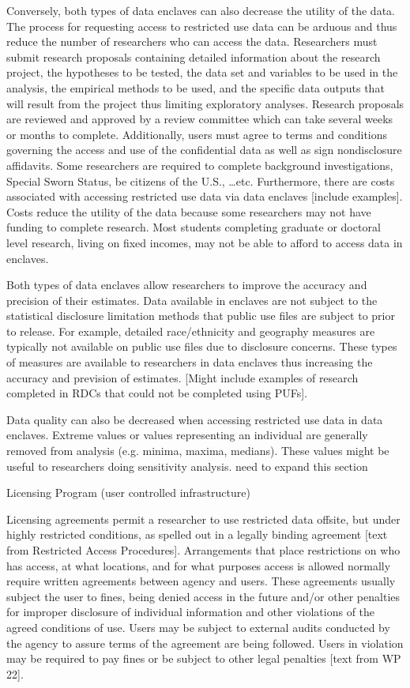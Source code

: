 \documentclass[12pt]{article}
\begin{document}
Conversely, both types of data enclaves can also decrease the utility of the data. The process for requesting access to restricted use data can be arduous and thus reduce the number of researchers who can access the data. Researchers must submit research proposals containing detailed information about the research project, the hypotheses to be tested, the data set and variables to be used in the analysis,
the empirical methods to be used, and the specific data outputs that will result from the project thus limiting exploratory analyses. Research proposals are reviewed and approved by a review committee which can take several weeks or months to complete. Additionally, users must agree to terms and conditions governing the access and use of the confidential data as well as sign nondisclosure affidavits. Some researchers are required to complete background investigations, Special Sworn Status, be citizens of the U.S.,  …etc.  Furthermore, there are costs associated with accessing restricted use data via data enclaves [include examples]. Costs reduce the utility of the data because some researchers may not have funding to complete research. Most students completing graduate or doctoral level research, living on fixed incomes, may not be able to afford to access data in enclaves. 

Both types of data enclaves allow researchers to improve the accuracy and precision of their estimates. Data available in enclaves are not subject to the statistical disclosure limitation methods that public use files are subject to prior to release. For example, detailed race/ethnicity and geography measures are typically not available on public use files due to disclosure concerns. These types of measures are available to researchers in data enclaves thus increasing the accuracy and prevision of estimates.  [Might include examples of research completed in RDCs that could not be completed using PUFs].

Data quality can also be decreased when accessing restricted use data in data enclaves. Extreme values or values representing an individual are generally removed from analysis (e.g. minima, maxima, medians). These values might be useful to researchers doing sensitivity analysis. {need to expand this section}

Licensing Program (user controlled infrastructure)

Licensing agreements permit a researcher to use restricted data offsite, but under highly restricted
conditions, as spelled out in a legally binding agreement [text from Restricted Access Procedures]. Arrangements that place restrictions on who has access, at what locations, and for what purposes access is allowed normally require written agreements between agency and users. These agreements usually subject the user to fines, being denied access in the future and/or other penalties for improper disclosure of individual information and other violations of the agreed conditions of use. Users may be subject to external audits conducted by the agency to assure terms of the agreement are being followed. Users in violation may be required to pay fines or be subject to other legal penalties [text from WP 22].
\end{document}
